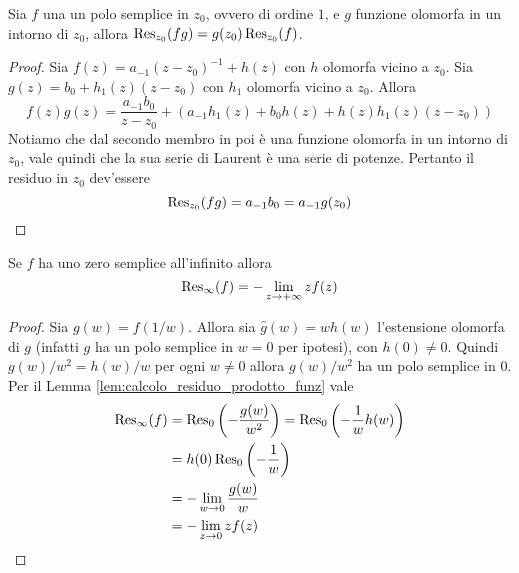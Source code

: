 \begin{lemma}
  Sia $f$ una un polo semplice in $z_0$, ovvero di ordine $1$, e $g$ funzione 
  olomorfa in un intorno di $z_0$, allora $\operatorname{Res}_{z_0}(fg) = g(z_0) \operatorname{Res}_{z_0}(f)$.
  \label{lem:calcolo_residuo_prodotto_funz}
\end{lemma}
\begin{proof}
  Sia $f(z) = a_{-1}(z-z_0)^{-1} + h(z)$ con $h$ olomorfa vicino a $z_0$. Sia
  $g(z) = b_0 + h_1(z) (z-z_0)$ con $h_1$ olomorfa vicino a $z_0$. Allora
  \begin{equation*}
    f(z)g(z) = \frac{a_{-1}b_0}{z-z_0} + \left(a_{-1}h_1(z) + b_0h(z)
    + h(z)h_1(z)(z-z_0)\right)
  \end{equation*}
  Notiamo che dal secondo membro in poi è una funzione olomorfa in un
  intorno di $z_0$, vale quindi che la sua serie di Laurent è una serie di 
  potenze. Pertanto il residuo in $z_0$ dev'essere
  \begin{equation*}
    \operatorname{Res}_{z_0}(fg) = a_{-1}b_0 = a_{-1}g(z_0)
  \end{equation*}
\end{proof}

\begin{corollary}
  Se $f$ ha uno zero semplice all'infinito allora 
  \begin{equation*}
    \operatorname{Res}_\infty(f) = - \lim_{z \to +\infty} z f(z)
  \end{equation*}
  \label{cor:calcolo_residuo_infinito}
\end{corollary}
\begin{proof}
  Sia $g(w) = f(1/w)$. Allora sia $\hat{g}(w) = w h(w)$ l'estensione olomorfa di
  $g$ (infatti $g$ ha un polo semplice in $w = 0$ per ipotesi), con $h(0) \neq 0$. 
  Quindi $g(w)/w^2 = h(w)/w$ per ogni $w \neq 0$ allora $g(w)/w^2$ ha un polo 
  semplice in $0$. Per il Lemma \ref{lem:calcolo_residuo_prodotto_funz} vale 
  \begin{align*}
    \operatorname{Res}_\infty(f) & = \operatorname{Res}_0\left( -\frac{g(w)}{w^2} \right)
    = \operatorname{Res}_0\left(-\frac{1}{w} h(w)\right) \\
    & = h(0) \operatorname{Res}_0 \left( -\frac{1}{w} \right) \\
    & = - \lim_{w \to 0} \frac{g(w)}{w} \\
    & = - \lim_{z \to 0} z f(z)
  \end{align*}
\end{proof}

